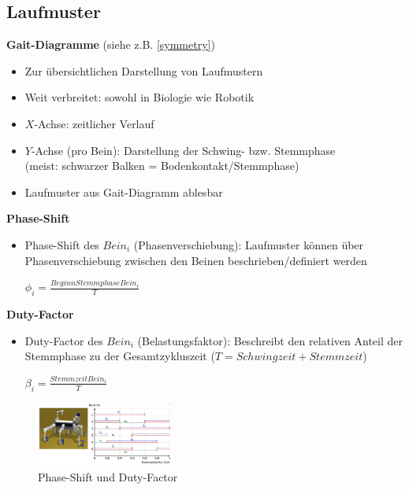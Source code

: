 \subsection{Laufmuster}
\textbf{Gait-Diagramme} (siehe z.B. \autoref{symmetry})
\begin{itemize}
\item Zur übersichtlichen Darstellung von Laufmustern
\item Weit verbreitet: sowohl in Biologie wie Robotik
\item $X$-Achse: zeitlicher Verlauf
\item $Y$-Achse (pro Bein): Darstellung der Schwing- bzw. Stemmphase\\
(meist: schwarzer Balken = Bodenkontakt/Stemmphase)
\item Laufmuster aus Gait-Diagramm \glqq ablesbar\grqq
\end{itemize}
\textbf{Phase-Shift}
\begin{itemize}
\item Phase-Shift des $Bein_i$ (Phasenverschiebung):
Laufmuster können über Phasenverschiebung zwischen den Beinen beschrieben/definiert werden\\
\begin{center}
$\phi_i = \frac{Beginn Stemmphase Bein_i}{T}$
\end{center}
\end{itemize}
\textbf{Duty-Factor}
\begin{itemize}
\item Duty-Factor des $Bein_i$ (Belastungsfaktor):
Beschreibt den relativen Anteil der Stemmphase zu der Gesamtzykluszeit ($T = Schwingzeit + Stemmzeit$)\\
\begin{center}
$\beta_i = \frac{Stemmzeit Bein_i}{T}$
\end{center}
\end{itemize}
\begin{figure}[h!]
	\centering
	\includegraphics[width=0.4\textwidth]{figures/ch06_PS_DF.png}
	\caption{Phase-Shift und Duty-Factor}
	\label{PS_DF}
\end{figure}
